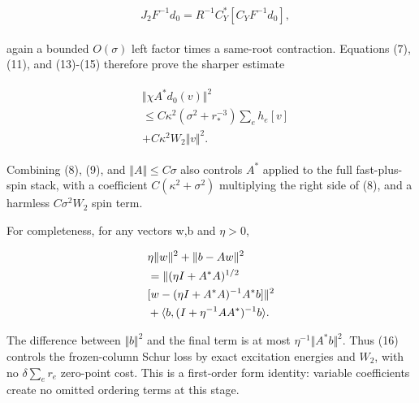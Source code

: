 \begin{gather*}
\begin{aligned}
& J_{2} F^{-1} d_{0}=R^{-1} C_{Y}^{*} [C_{Y} F^{-1} d_{0}],
\end{aligned}\tag{15}
\end{gather*}

again a bounded \(O(\sigma )\) left factor times a same-root
contraction. Equations (7), (11), and (13)-(15) therefore prove the
sharper estimate

\begin{gather*}
\begin{aligned}
& \Vert \chi  A^{*} d_{0}(v)\Vert ^{2} \\
& \le  C \kappa ^{2} (\sigma ^{2}+r_{*}^{-3}) \sum _{e} h_{e}[v] \\
& + C \kappa ^{2} W_{2} \Vert v\Vert ^{2}.
\end{aligned}\tag{16}
\end{gather*}

Combining (8), (9), and \(\Vert A\Vert \le C \sigma\) also controls
\(A^{*}\) applied to the full fast-plus-spin stack, with a coefficient
\(C(\kappa ^{2}+\sigma ^{2})\) multiplying the right side of (8), and a
harmless \(C \sigma ^{2} W_{2}\) spin term.

For completeness, for any vectors w,b and \(\eta >0\),

\begin{gather*}
\begin{aligned}
& \eta \Vert w\Vert ^{2}+\Vert b-Aw\Vert ^{2} \\
& =\Vert (\eta  I+A^{*}A)^{1/2} \\
& [w-(\eta  I+A^{*}A)^{-1} A^{*}b]\Vert ^{2} \\
& +\langle b,(I+\eta ^{-1} A A^{*})^{-1} b\rangle .
\end{aligned}\notag
\end{gather*}

The difference between \(\Vert b\Vert ^{2}\) and the final term is at
most \(\eta ^{-1}\Vert A^{*}b\Vert ^{2}\). Thus (16) controls the
frozen-column Schur loss by exact excitation energies and \(W_{2}\),
with no \(\delta  \sum _{e} r_{e}\) zero-point cost. This is a
first-order form identity: variable coefficients create no omitted
ordering terms at this stage.


